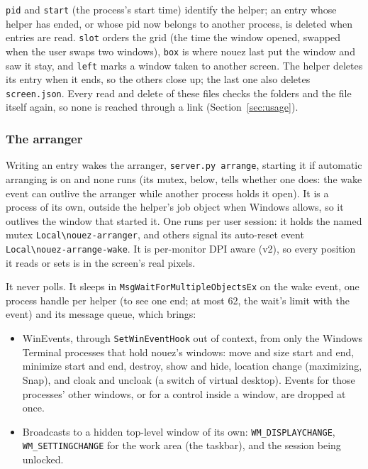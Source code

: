 \documentclass[10pt,a4paper]{article}
\newcommand{\code}[1]{\texttt{#1}}
\begin{document}
\code{pid} and \code{start} (the process's start time) identify the helper; an entry whose
helper has ended, or whose pid now belongs to another process, is deleted when entries are read.
\code{slot} orders the grid (the time the window opened, swapped when the user swaps two windows),
\code{box} is where nouez last put the window and saw it stay, and \code{left} marks a window taken
to another screen. The helper deletes its entry when it ends, so the others close up; the
last one also deletes \code{screen.json}. Every read and delete of these files checks the folders
and the file itself again, so none is reached through a link (Section~\ref{sec:usage}).

\subsubsection*{The arranger}

Writing an entry wakes the arranger, \code{server.py arrange}, starting it if automatic arranging is on and none runs (its
mutex, below, tells whether one does: the wake event can outlive the arranger while another process
holds it open). It is a process of its own, outside the helper's job object when Windows allows, so it outlives the window
that started it. One runs per user session: it holds the named mutex
\code{Local\textbackslash{}nouez-arranger}, and others signal its auto-reset event
\code{Local\textbackslash{}nouez-arrange-wake}. It is per-monitor DPI aware (v2), so every position
it reads or sets is in the screen's real pixels.

It never polls. It sleeps in \code{MsgWaitForMultipleObjectsEx} on the wake event, one process
handle per helper (to see one end; at most 62, the wait's limit with the event) and its message
queue, which brings:

\begin{itemize}
  \item WinEvents, through \code{SetWinEventHook} out of context, from only the Windows Terminal
        processes that hold nouez's windows: move and size start and end, minimize start and end,
        destroy, show and hide, location change (maximizing, Snap), and cloak and uncloak
        (a switch of virtual desktop). Events for those processes' other
        windows, or for a control inside a window, are dropped at once.
  \item Broadcasts to a hidden top-level window of its own: \code{WM\_DISPLAYCHANGE},
        \code{WM\_SETTINGCHANGE} for the work area (the taskbar), and the session being unlocked.
\end{itemize}
\end{document}
